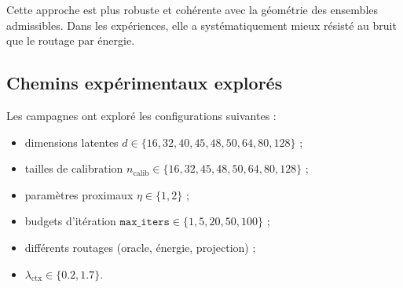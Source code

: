 \documentclass[11pt,a4paper]{article}
\newcommand{\1}{\mathbf 1}
\begin{document}
Cette approche est plus robuste et cohérente avec la géométrie des ensembles admissibles. Dans les expériences, elle a systématiquement mieux résisté au bruit que le routage par énergie.

\subsection{Chemins expérimentaux explorés}

Les campagnes ont exploré les configurations suivantes :
\begin{itemize}[leftmargin=2em]
    \item dimensions latentes \(d \in \{16,32,40,45,48,50,64,80,128\}\) ;
    \item tailles de calibration \(n_{\mathrm{calib}} \in \{16,32,45,48,50,64,80,128\}\) ;
    \item paramètres proximaux \(\eta \in \{1,2\}\) ;
    \item budgets d’itération \(\texttt{max\_iters} \in \{1,5,20,50,100\}\) ;
    \item différents routages (oracle, énergie, projection) ;
    \item \(\lambda_{\mathrm{ctx}} \in \{0.2, 1.7\}\).
\end{itemize}
\end{document}
